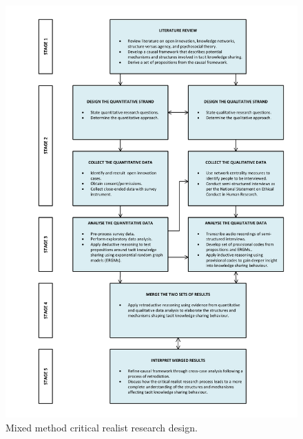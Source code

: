 \begin{figure}[p]
\centering
\includegraphics[width = 1.0\textwidth]{Images/mm.pdf}
\caption[Mixed method research design]{Mixed method critical realist research design.}
\label{fig:mm}
\end{figure}

